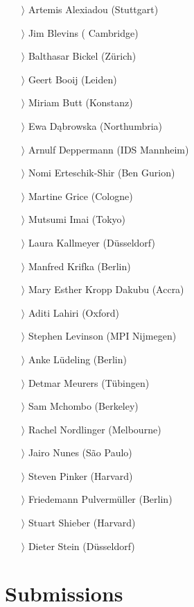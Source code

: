 \documentclass[
notumble,
nofoldmark,
]{leaflet}
\begin{document}
\begin{itemize}
 \item[$\rangle$] Artemis Alexiadou (Stuttgart)
 \item[$\rangle$] Jim Blevins ( Cambridge)
 \item[$\rangle$] Balthasar Bickel (Z\"urich)
 \item[$\rangle$] Geert Booij (Leiden)
 \item[$\rangle$] Miriam Butt (Konstanz)
 \item[$\rangle$] Ewa D\k{a}browska (Northumbria)
 \item[$\rangle$] Arnulf Deppermann (IDS Mannheim)
 \item[$\rangle$] Nomi Erteschik-Shir (Ben Gurion)
 \item[$\rangle$] Martine Grice (Cologne)
 \item[$\rangle$] Mutsumi Imai (Tokyo)
 \item[$\rangle$] Laura Kallmeyer (D\"usseldorf)
 \item[$\rangle$] Manfred Krifka (Berlin)
 \item[$\rangle$] Mary Esther Kropp Dakubu (Accra)
 \item[$\rangle$] Aditi Lahiri (Oxford)
 \item[$\rangle$] Stephen Levinson (MPI Nijmegen)
 \item[$\rangle$] Anke L\"udeling (Berlin)
 \item[$\rangle$] Detmar Meurers (T\"ubingen)
 \item[$\rangle$] Sam Mchombo (Berkeley)
 \item[$\rangle$] Rachel Nordlinger (Melbourne)
 \item[$\rangle$] Jairo Nunes (S\~ao Paulo)
 \item[$\rangle$] Steven Pinker (Harvard)
 \item[$\rangle$] Friedemann Pulverm\"uller (Berlin)
 \item[$\rangle$] Stuart Shieber (Harvard)
 \item[$\rangle$] Dieter Stein (D\"usseldorf)  
\end{itemize}

    
    
     
   
   
\newpage 
\section{\sffamily\Large Submissions}
\end{document}
